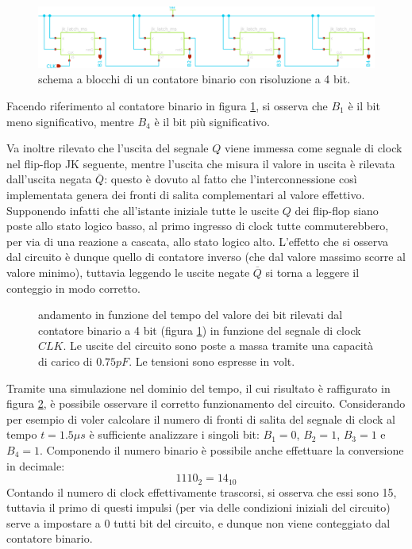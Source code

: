 	\begin{figure}[bht]
		\centering
		\includegraphics[width=\linewidth]{Immagini/count-sch}
		\caption{schema a blocchi di un contatore binario con risoluzione a 4 bit.}
		\label{fig:count:sch}
	\end{figure}
	
	Facendo riferimento al contatore binario in figura \ref{fig:count:sch}, si osserva che $B_1$ è il bit meno significativo, mentre $B_4$ è il bit più significativo.
	
	Va inoltre rilevato che l'uscita del segnale $Q$ viene immessa come segnale di clock nel flip-flop JK seguente, mentre l'uscita che misura il valore in uscita è rilevata dall'uscita negata $\overline Q$: questo è dovuto al fatto che l'interconnessione così implementata genera dei fronti di salita complementari al valore effettivo. Supponendo infatti che all'istante iniziale tutte le uscite $Q$ dei flip-flop siano poste allo stato logico basso, al primo ingresso di clock tutte commuterebbero, per via di una reazione a cascata, allo stato logico alto. L'effetto che si osserva dal circuito è dunque quello di contatore inverso (che dal valore massimo scorre al valore minimo), tuttavia leggendo le uscite negate $\overline Q$ si torna a leggere il conteggio in modo corretto.
	
	\begin{figure}[bht]
		\centering
		
		\vspace{3mm}
		\caption{andamento in funzione del tempo del valore dei bit rilevati dal contatore binario a 4 bit (figura \ref{fig:count:sch}) in funzione del segnale di clock $CLK$. Le uscite del circuito sono poste a massa tramite una capacità di carico di $0.75pF$. Le tensioni sono espresse in volt.}
		\label{fig:count:mult}
	\end{figure}
	
	Tramite una simulazione nel dominio del tempo, il cui risultato è raffigurato in figura \ref{fig:count:mult}, è possibile osservare il corretto funzionamento del circuito. Considerando per esempio di voler calcolare il numero di fronti di salita del segnale di clock al tempo $t=1.5\mu s$ è sufficiente analizzare i singoli bit: $B_1 = 0$, $B_2 = 1$, $B_3=1$ e $B_4=1$. Componendo il numero binario è possibile anche effettuare la conversione in decimale:
	\[ 1110_2 = 14_{10} \]
	Contando il numero di clock effettivamente trascorsi, si osserva che essi sono 15, tuttavia il primo di questi impulsi (per via delle condizioni iniziali del circuito) serve a impostare a 0 tutti bit del circuito, e dunque non viene conteggiato dal contatore binario.
	
